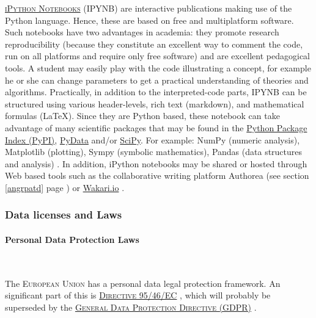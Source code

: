 \vspace{0.4cm}

 \textsc{\href{http://ipython.org/notebook.html}{iPython Notebooks}} (IPYNB) are interactive publications making use of the Python language. Hence, these are based on free and multiplatform software. Such notebooks have two advantages in academia: they promote research reproducibility (because they constitute an excellent way to comment the code, run on all platforms and require only free software) and are excellent pedagogical tools. A student may easily play with the code illustrating a concept, for example he or she can change parameters to get a practical understanding of theories and algorithms. Practically, in addition to the interpreted-code parts, IPYNB can be structured using various header-levels, rich text (markdown), and mathematical formulas (\LaTeX). Since they are Python based, these notebook can take advantage of many scientific packages that may be found in the \href{https://pypi.python.org/pypi}{Python Package Index (PyPI)}, \href{http://pydata.org/downloads/}{PyData} and/or \href{http://www.scipy.org/}{SciPy}. For example: NumPy (numeric analysis), Matplotlib (plotting), Sympy (symbolic mathematics), Pandas (data structures and analysis) \cite{numpy_numpy_2015,python_software_foundation_python.org_2015}. In addition, iPython notebooks may be shared or hosted through Web based tools such as the collaborative writing platform Authorea (see section \ref{angrpatd} page \pageref{angrpatd}) or \href{https://wakari.io/}{Wakari.io} \cite{wikipedia_ipython_2015,ipython.org_ipython_2015}.

\subsubsection{Data licenses and Laws}

\paragraph{Personal Data Protection Laws}

~

\noindent {} The \textsc{European Union} has a personal data legal protection framework. An significant part of this is \textsc{\href{http://eur-lex.europa.eu/LexUriServ/LexUriServ.do?uri=CELEX:31995L0046:en:HTML}{Directive 95/46/EC}} \cite{eurlex_9546ec_1995}, which will probably be superseded by the \textsc{\href{https://en.wikipedia.org/wiki/General_Data_Protection_Regulation}{General Data Protection Directive (GDPR)}} \cite{wikipedia_general_2015}.

